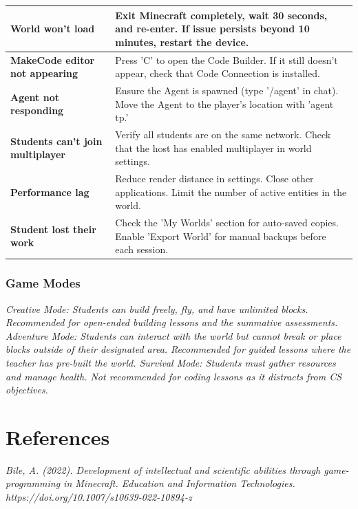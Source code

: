 \documentclass[11pt,letterpaper]{article}
\begin{document}
\begin{longtable}{|L{0.28\textwidth}|L{0.65\textwidth}|}
\hline
{}
\textbf{World won't load}  & Exit Minecraft completely, wait 30 seconds, and re-enter. If issue persists beyond 10 minutes, restart the device.  \\
\hline
\textbf{MakeCode editor not appearing}  & Press 'C' to open the Code Builder. If it still doesn't appear, check that Code Connection is installed.  \\
\hline
\textbf{Agent not responding}  & Ensure the Agent is spawned (type '/agent' in chat). Move the Agent to the player's location with 'agent tp.'  \\
\hline
\textbf{Students can't join multiplayer}  & Verify all students are on the same network. Check that the host has enabled multiplayer in world settings.  \\
\hline
\textbf{Performance lag}  & Reduce render distance in settings. Close other applications. Limit the number of active entities in the world.  \\
\hline
\textbf{Student lost their work}  & Check the 'My Worlds' section for auto-saved copies. Enable 'Export World' for manual backups before each session.  \\
\hline
\end{longtable}

\subsubsection{Game Modes}

\textit{Creative Mode: Students can build freely, fly, and have unlimited blocks. Recommended for open-ended building lessons and the summative assessments. Adventure Mode: Students can interact with the world but cannot break or place blocks outside of their designated area. Recommended for guided lessons where the teacher has pre-built the world. Survival Mode: Students must gather resources and manage health. Not recommended for coding lessons as it distracts from CS objectives.}

\newpage
\section{References}
\label{sec:References}

\textit{Bile, A. (2022). Development of intellectual and scientific abilities through game-programming in Minecraft. Education and Information Technologies. https://doi.org/10.1007/s10639-022-10894-z}
\end{document}
